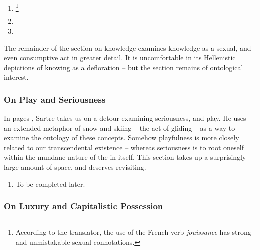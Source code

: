 \begin{enumerate}
  \item {}\footnote{According to the translator, the use of the French verb \emph{jouissance} has strong and unmistakable sexual connotations.}
  \item {}
  \item {}
\end{enumerate}

\noindent
The remainder of the section on knowledge \autocite[750 -- 752]{sartre} examines knowledge as a sexual, and even consumptive act in greater detail. It is uncomfortable in its Hellenistic depictions of knowing as a defloration -- but the section remains of ontological interest.

\subsubsection{On Play and Seriousness}

In pages \autocite[752 -- 760]{sartre}, Sartre takes us on a detour examining seriousness, and play. He uses an extended metaphor of snow and skiing -- the act of gliding -- as a way to examine the ontology of these concepts. Somehow playfulness is more closely related to our transcendental existence -- whereas seriousness is to root oneself within the mundane nature of the in-itself. This section takes up a surprisingly large amount of space, and deserves revisiting.

\begin{enumerate}
  \item To be completed later.
\end{enumerate}

\subsubsection{On Luxury and Capitalistic Possession}

